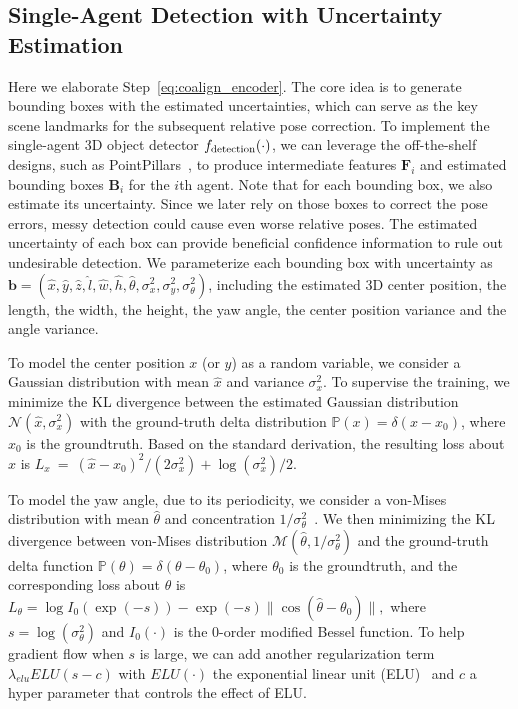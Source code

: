 \documentclass[letterpaper, 10 pt, conference]{ieeeconf}  %
\begin{document}
\subsection{Single-Agent Detection with Uncertainty Estimation}
\label{sec:detection}
Here we elaborate Step~\eqref{eq:coalign_encoder}. The core idea is to generate bounding boxes with the estimated uncertainties, which can serve as the key scene landmarks for the subsequent relative pose correction. To implement the single-agent 3D object detector $f_{\rm detection}(\cdot)$, we can leverage the off-the-shelf designs, such as PointPillars~\cite{lang2019pointpillars}, to produce intermediate features $\mathbf{F}_i$ and estimated bounding boxes $\mathbf{B}_i$ for the $i$th agent. Note that for each bounding box, we also estimate its uncertainty. Since we later rely on those boxes to correct the pose errors, messy detection could cause even worse relative poses. The estimated uncertainty of each box can provide beneficial confidence information to rule out 
undesirable detection.  We parameterize each bounding box with uncertainty as $\mathbf{b} = (\widehat{x},  \widehat{y}, \widehat{z},\widehat{l}, \widehat{w}, \widehat{h}, \widehat{\theta}, \sigma_{x}^2, \sigma_{y}^2, \sigma_{\theta}^2 )$, including the estimated 3D center position, the length, the width, the height, the yaw angle, the center position variance and the angle variance.

To model the center position $x$ (or $y$) as a random variable, we consider a Gaussian distribution with mean $\widehat{x}$ and variance $\sigma_{x}^2$. To supervise the training, we minimize the KL divergence between the estimated Gaussian distribution $\mathcal{N}(\widehat{x},\sigma_{x}^2)$ with the ground-truth delta distribution $\mathbb{P}(x) = \delta(x - x_0)$, where $x_0$ is the groundtruth. Based on the standard derivation, the resulting loss about $x$ is
$
L_{x} \ = \ {\left(\widehat{x} - x_0 \right)^{2}}/{(2 \sigma_{x}^{2})}+ {\log \left(\sigma_{x}^{2}\right)}/{2}.
$


To model the yaw angle, due to its periodicity, we consider a von-Mises distribution with mean $\widehat{\theta}$ and concentration $1/\sigma_{\theta}^2$~\cite{zhong2020uncertainty}. We then minimizing the KL divergence between von-Mises distribution $\mathcal{M}(\widehat{\theta}, 1/\sigma_{\theta}^2)$ and the ground-truth delta function $\mathbb{P}(\theta) = \delta(\theta - \theta_0)$, where $\theta_0$ is the groundtruth, and the corresponding loss about $\theta$ is
$
L_{\theta}=\log I_{0}(\exp (-s))-\exp (-s) \| \cos (\widehat{\theta}-\theta_0)\|,
$
where $s = \log (\sigma_{\theta}^2)$ and $I_0(\cdot)$ is the 0-order modified Bessel function.  To help gradient flow when $s$ is large, we can add another regularization term  $\lambda_{elu} E L U\left(s- c\right)$ with $E L U(\cdot)$ the exponential linear unit (ELU)~\cite{zhong2020uncertainty,clevert2015fast} and $c$ a hyper parameter that controls the effect of ELU.  
\end{document}
